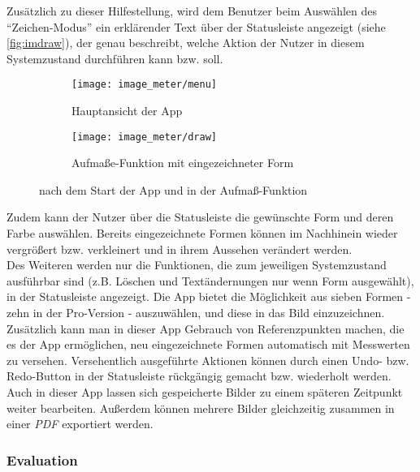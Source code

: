 Zusätzlich zu dieser Hilfestellung, wird dem Benutzer beim Auswählen des ``Zeichen-Modus'' ein erklärender Text über der Statusleiste angezeigt (siehe \autoref{fig:imdraw}), der genau beschreibt, welche Aktion der Nutzer in diesem Systemzustand durchführen kann bzw. soll. \\

\begin{figure}[h]
  \centering
  \begin{subfigure}[t]{0.4\textwidth}
    \texttt{[image: image\_meter/menu]}
    \caption{Hauptansicht der App}
    \label{fig:immenu}	
  \end{subfigure}
  \begin{subfigure}[t]{0.4\textwidth}
    \texttt{[image: image\_meter/draw]}
    \caption{Aufmaße-Funktion mit eingezeichneter Form} 
    \label{fig:imdraw}	
  \end{subfigure}
  \caption{\im{} nach dem Start der App und in der Aufmaß-Funktion}
\end{figure}

\noindent
Zudem kann der Nutzer über die Statusleiste die gewünschte Form und deren Farbe auswählen.
Bereits eingezeichnete Formen können im Nachhinein wieder vergrößert bzw. verkleinert und in ihrem Aussehen verändert werden. \\

Des Weiteren werden nur die Funktionen, die zum jeweiligen Systemzustand ausführbar sind (z.B. Löschen und Textändernungen nur wenn Form ausgewählt), in der Statusleiste angezeigt.
Die App bietet die Möglichkeit aus sieben Formen - zehn in der Pro-Version - auszuwählen, und diese in das Bild einzuzeichnen.
Zusätzlich kann man in dieser App Gebrauch von Referenzpunkten machen, die es der App ermöglichen, neu eingezeichnete Formen automatisch mit Messwerten zu versehen.
Versehentlich ausgeführte Aktionen können durch einen Undo- bzw. Redo-Button in der Statusleiste rückgängig gemacht bzw. wiederholt werden. \\

Auch in dieser App lassen sich gespeicherte Bilder zu einem späteren Zeitpunkt weiter bearbeiten.
Außerdem können mehrere Bilder gleichzeitig zusammen in einer \emph{PDF} exportiert werden.

\subsubsection{Evaluation}

